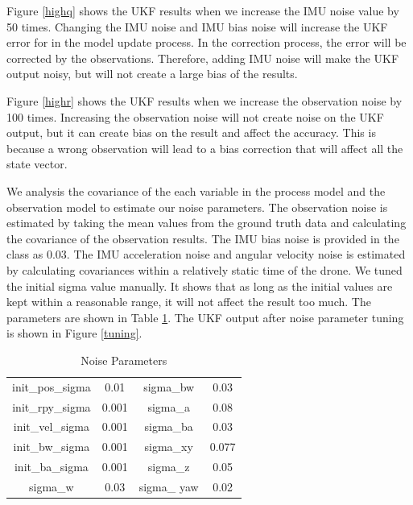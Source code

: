 \documentclass[letter, 10pt]{article}
\begin{document}
\begin{onehalfspacing}
Figure \ref{highq} shows the UKF results when we increase the IMU noise value by 50 times. Changing the IMU noise and IMU bias noise will increase the UKF error for in the model update process. In the correction process, the error will be corrected by the observations. Therefore, adding IMU noise will make the UKF output noisy, but will not create a large bias of the results.

Figure \ref{highr} shows the UKF results when we increase the observation noise by 100 times. Increasing the observation noise will not create noise on the UKF output, but it can create bias on the result and affect the accuracy. This is because a wrong observation will lead to a bias correction that will affect all the state vector. 

We analysis the covariance of the each variable in the process model and the observation model to estimate our noise parameters. The observation noise is estimated by taking the mean values from the ground truth data and calculating the covariance of the observation results. The IMU bias noise is provided in the class as 0.03. The IMU acceleration noise and angular velocity noise is estimated by calculating covariances within a relatively static time of the drone. We tuned the initial sigma value manually. It shows that as long as the initial values are kept within a reasonable range, it will not affect the result too much. The parameters are shown in Table \ref{np}. The UKF output after noise parameter tuning is shown in Figure \ref{tuning}.

\begin{center}
\begin{table}[h]
\caption{Noise Parameters}
\label{np}
\centering\begin{tabular}{cccc}
\hline
init\_pos\_sigma    & 0.01    & sigma\_bw           & 0.03      \\
init\_rpy\_sigma    & 0.001   &  sigma\_a            & 0.08      \\
init\_vel\_sigma    & 0.001    &  sigma\_ba           & 0.03    \\
init\_bw\_sigma     & 0.001    &  sigma\_xy           & 0.077     \\
init\_ba\_sigma     & 0.001      &  sigma\_z            & 0.05  \\
sigma\_w            & 0.03       & sigma\_ yaw           & 0.02  \\ \hline
\end{tabular}
\end{table}
\end{center}


\end{onehalfspacing}
\end{document}
